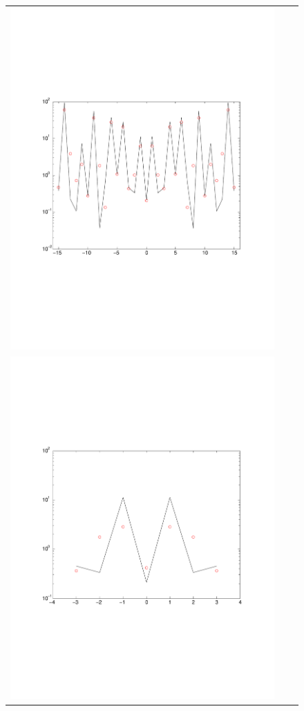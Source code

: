 \begin{figure}[htpb]
\begin{tabular}{ccc}
  \includegraphics[scale=0.25]{figs/tracAliasingUp1N32} \\
  \includegraphics[scale=0.25]{figs/tracAliasingUp2N08} &

\end{tabular}
\end{figure}
